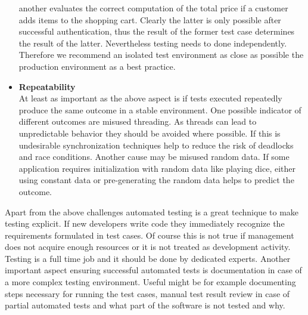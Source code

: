 \documentclass[12pt, notitlepage]{article}
\begin{document}
\begin{itemize}
	another evaluates the correct computation of the total price if a customer adds items to the shopping cart.
	Clearly the latter is only possible after successful authentication, thus the result of the former test case determines the result of the latter.
	Nevertheless testing needs to done independently. Therefore we recommend an isolated test environment as close as possible the production environment
	as a best practice.
	\item \textbf{Repeatability}\\
	At least as important as the above aspect is if tests executed repeatedly produce the same outcome in a stable environment. One possible 
	indicator of different outcomes are misused threading. As threads can lead to unpredictable behavior they should be avoided where possible. 
	If this is undesirable synchronization techniques help to reduce the risk of deadlocks and race conditions. 
	Another cause may be misused random data. If some application requires initialization with random data like playing dice, either using constant data
	or pre-generating the random data helps to predict the outcome. 
\end{itemize}
Apart from the above challenges automated testing is a great technique to make testing explicit. If new developers write code they immediately recognize 
the requirements formulated in test cases. Of course this is not true if management does not acquire enough resources or it is not treated as development activity.
Testing is a full time job and it should be done by dedicated experts.
Another important aspect ensuring successful automated tests is documentation in case of a more complex testing environment. Useful might be for example
documenting steps necessary for running the test cases, manual test result review in case of partial automated tests and what part of the software is not
tested and why. 
\end{document}
